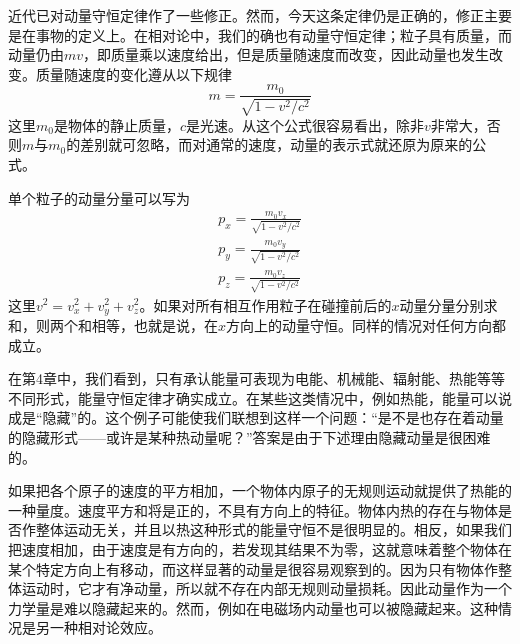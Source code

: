 近代已对动量守恒定律作了一些修正。然而，今天这条定律仍是正确的，修正主要是在事物的定义上。在相对论中，我们的确也有动量守恒定律；粒子具有质量，而动量仍由$mv$，即质量乘以速度给出，但是质量随速度而改变，因此动量也发生改变。质量随速度的变化遵从以下规律
\begin{equation}
    \label{Eq:I:10:7}
    m=\frac{m_0}{\sqrt{1-v^2/c^2}}
\end{equation}
这里$m_0$是物体的静止质量，$c$是光速。从这个公式很容易看出，除非$v$非常大，否则$m$与$m_0$的差别就可忽略，而对通常的速度，动量的表示式就还原为原来的公式。

单个粒子的动量分量可以写为
\begin{equation}
    \label{Eq:I:10:8}
    \begin{split}
        p_x=\frac{m_0v_x}{\sqrt{1-v^2/c^2}} \\
        p_y=\frac{m_0v_y}{\sqrt{1-v^2/c^2}} \\
        p_z=\frac{m_0v_z}{\sqrt{1-v^2/c^2}}
    \end{split}
\end{equation}
这里$v^2=v_x^2+v_y^2+v_z^2$。如果对所有相互作用粒子在碰撞前后的$x$动量分量分别求和，则两个和相等，也就是说，在$x$方向上的动量守恒。同样的情况对任何方向都成立。

在第4章中，我们看到，只有承认能量可表现为电能、机械能、辐射能、热能等等不同形式，能量守恒定律才确实成立。在某些这类情况中，例如热能，能量可以说成是“隐藏”的。这个例子可能使我们联想到这样一个问题：“是不是也存在着动量的隐藏形式——或许是某种热动量呢？”答案是由于下述理由隐藏动量是很困难的。

如果把各个原子的速度的平方相加，一个物体内原子的无规则运动就提供了热能的一种量度。速度平方和将是正的，不具有方向上的特征。物体内热的存在与物体是否作整体运动无关，并且以热这种形式的能量守恒不是很明显的。相反，如果我们把速度相加，由于速度是有方向的，若发现其结果不为零，这就意味着整个物体在某个特定方向上有移动，而这样显著的动量是很容易观察到的。因为只有物体作整体运动时，它才有净动量，所以就不存在内部无规则动量损耗。因此动量作为一个力学量是难以隐藏起来的。然而，例如在电磁场内动量也可以被隐藏起来。这种情况是另一种相对论效应。

